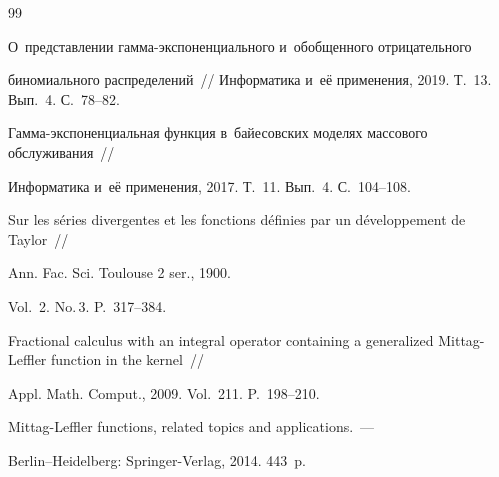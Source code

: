 {\small\frenchspacing


{%




\begin{thebibliography}{99}






О~представлении гам\-ма-экс\-по\-нен\-ци\-аль\-но\-го и~обобщенного отрицательного 


биномиального распределений~/\!\!/ Информатика и~её применения, 2019. Т.~13. Вып.~4. С.~78--82.









Гамма-экс\-по\-нен\-ци\-аль\-ная функция в~байесовских моделях массового обслуживания~/\!\!/ 


Информатика и~её применения, 2017. Т.~11. Вып.~4. С.~104--108.









Sur les s{\'{e}}ries divergentes et les fonctions d{\'{e}}finies par un d{\'{e}}veloppement de Taylor~/\!\!/ 


Ann. Fac. Sci. Toulouse 2 ser., 1900. 


Vol.~2. No.\,3. P.~317--384.









Fractional calculus with an integral operator containing a generalized Mittag-Leffler function in the kernel~/\!\!/ 


Appl. Math. Comput., 2009. Vol.~211. P.~198--210.









Mittag-Leffler functions, related topics and applications.~--- 


Berlin--Heidelberg: Springer-Verlag, 2014. 443~p.






\end{thebibliography}}}
